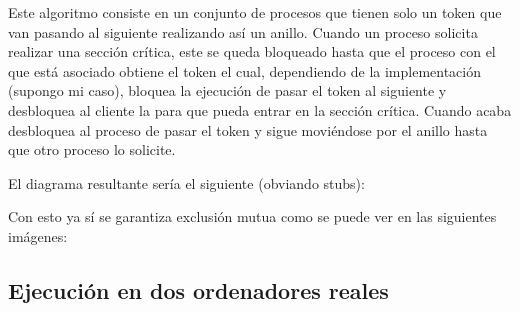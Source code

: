 \documentclass{article}
\begin{document}
Este algoritmo consiste en un conjunto de procesos que tienen solo un token que van pasando al siguiente realizando así un anillo. Cuando un proceso solicita realizar una sección crítica, este se queda bloqueado hasta que el proceso con el que está asociado obtiene el token el cual, dependiendo de la implementación (supongo mi caso), bloquea la ejecución de pasar el token al siguiente y desbloquea al cliente la para que pueda entrar en la sección crítica. Cuando acaba desbloquea al proceso de pasar el token y sigue moviéndose por el anillo hasta que otro proceso lo solicite.

El diagrama resultante sería el siguiente (obviando stubs):


Con esto ya sí se garantiza exclusión mutua como se puede ver en las siguientes imágenes:




\subsection{Ejecución en dos ordenadores reales}
\end{document}
